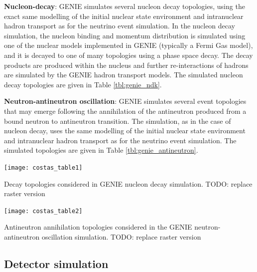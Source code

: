{\bf Nucleon-decay}: GENIE simulates several nucleon decay topologies, using the exact same modelling of the initial nuclear state environment and intranuclear hadron transport as for the neutrino event simulation. In the nucleon decay simulation, the nucleon binding and momentum distribution is simulated using one of the nuclear models implemented in GENIE (typically a Fermi Gas model), and it is decayed to one of many topologies using a phase space decay. The decay products are produced within the nucleus and further re-interactions of hadrons are simulated by the GENIE hadron transport models. The simulated nucleon decay topologies are given in Table \ref{tbl:genie_ndk}.

{\bf Neutron-antineutron oscillation}: GENIE simulates several event topologies that may emerge following the annihilation of the antineutron produced from a bound neutron to antineutron transition. The simulation, as in the case of nucleon decay, uses the same modelling of the initial nuclear state environment and intranuclear hadron transport as for the neutrino event simulation. The simulated topologies are given in Table \ref{tbl:genie_antineutron}.

\begin{table}
  \texttt{[image: costas\_table1]}
  
  \caption[GENIE nucleon decay topologies]{Decay topologies considered in GENIE nucleon decay simulation. TODO: replace raster version}
  \label{tbl:genie_ndk}
\end{table}

\begin{table}
	\begin{centering}
		\texttt{[image: costas\_table2]}\\
    \end{centering}
  
  \caption[GENIE antineutron annihilation topologies]{Antineutron annihilation topologies considered in the GENIE neutron-antineutron oscillation simulation. TODO: replace raster version}
  \label{tbl:genie_antineutron}
\end{table}

\subsection{Detector simulation}
\label{sec:tools-mc-detsim}

